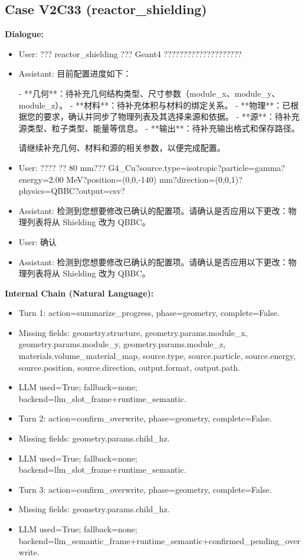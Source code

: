 \documentclass[11pt]{ctexart}
\begin{document}
\subsection{Case V2C33 (reactor\_shielding)}
\textbf{Dialogue:}
\begin{itemize}
\item User: ??? reactor\_shielding ??? Geant4 ????????????????????
\item Assistant: 目前配置进度如下：

- **几何**：待补充几何结构类型、尺寸参数（module\_x、module\_y、module\_z）。
- **材料**：待补充体积与材料的绑定关系。
- **物理**：已根据您的要求，确认并同步了物理列表及其选择来源和依据。
- **源**：待补充源类型、粒子类型、能量等信息。
- **输出**：待补充输出格式和保存路径。

请继续补充几何、材料和源的相关参数，以便完成配置。
\item User: ???? ?? 80 mm??? G4\_Cu?source.type=isotropic?particle=gamma?energy=2.00 MeV?position=(0,0,-140) mm?direction=(0,0,1)?physics=QBBC?output=csv?
\item Assistant: 检测到您想要修改已确认的配置项。请确认是否应用以下更改：物理列表将从 Shielding 改为 QBBC。
\item User: 确认
\item Assistant: 检测到您想要修改已确认的配置项。请确认是否应用以下更改：物理列表将从 Shielding 改为 QBBC。
\end{itemize}
\textbf{Internal Chain (Natural Language):}
\begin{itemize}
\item Turn 1: action=summarize\_progress, phase=geometry, complete=False.
\item Missing fields: geometry.structure, geometry.params.module\_x, geometry.params.module\_y, geometry.params.module\_z, materials.volume\_material\_map, source.type, source.particle, source.energy, source.position, source.direction, output.format, output.path.
\item LLM used=True; fallback=none; backend=llm\_slot\_frame+runtime\_semantic.
\item Turn 2: action=confirm\_overwrite, phase=geometry, complete=False.
\item Missing fields: geometry.params.child\_hz.
\item LLM used=True; fallback=none; backend=llm\_slot\_frame+runtime\_semantic.
\item Turn 3: action=confirm\_overwrite, phase=geometry, complete=False.
\item Missing fields: geometry.params.child\_hz.
\item LLM used=True; fallback=none; backend=llm\_semantic\_frame+runtime\_semantic+confirmed\_pending\_overwrite.
\end{itemize}
\end{document}
